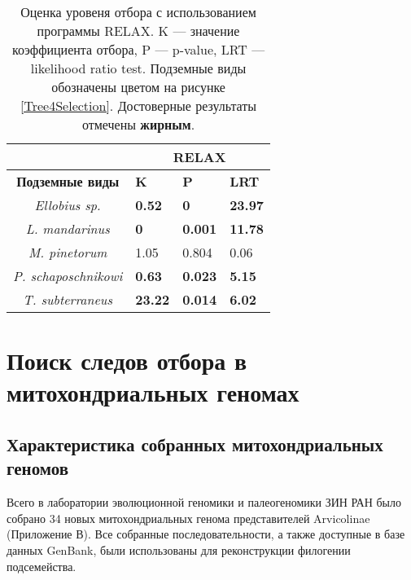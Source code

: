 \begin{table}[h!]
	\caption{Оценка уровеня отбора с использованием программы RELAX. K --- значение коэффициента отбора, P --- p-value, LRT --- likelihood ratio test. Подземные виды обозначены цветом на рисунке \ref{Tree4Selection}. Достоверные результаты отмечены \textbf{жирным}.}\label{Relax_cyt}
	\vspace{5mm}
	
\begin{center}
	\begin{tabular}{|c|l|l|l|}
		\hline
		\textbf{}                     & \multicolumn{3}{c|}{RELAX}              \\ \hline
		\textbf{Подземные виды} & \textbf{K}     & \textbf{P}     & \textbf{LRT}   \\ \hline
		\textit{Ellobius sp.}         & \textbf{0.52}  & \textbf{0}     & \textbf{23.97} \\ \hline
		\textit{L. mandarinus}        & \textbf{0}     & \textbf{0.001} & \textbf{11.78} \\ \hline
		\textit{M. pinetorum}         & 1.05           & 0.804          & 0.06           \\ \hline
		\textit{P. schaposchnikowi}   & \textbf{0.63}  & \textbf{0.023} & \textbf{5.15}  \\ \hline
		\textit{T. subterraneus}      & \textbf{23.22} & \textbf{0.014} & \textbf{6.02}  \\ \hline
	\end{tabular}
\end{center}
\end{table}



\section{Поиск следов отбора в митохондриальных геномах}

\subsection{Характеристика собранных митохондриальных геномов}

Всего в лаборатории эволюционной геномики и палеогеномики ЗИН РАН было собрано 34 новых митохондриальных генома представителей Arvicolinae (Приложение В). Все собранные последовательности, а также доступные в базе данных GenBank, были использованы для реконструкции филогении подсемейства.


